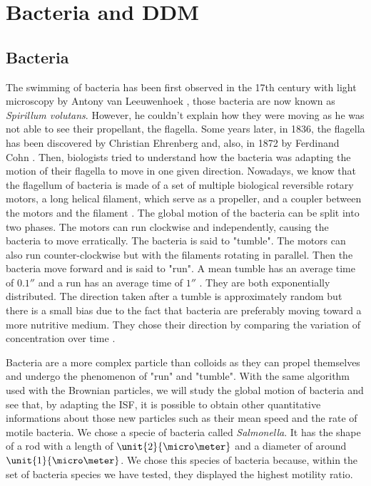 \documentclass[%
 aip,
 jmp,%
 amsmath,amssymb,
reprint,%
]{revtex4-1}
\begin{document}
\section{Bacteria and DDM}
\label{sec:BactSection}

\subsection{Bacteria}

The swimming of bacteria has been first observed in the 17th century with light microscopy by Antony van Leeuwenhoek \citep{23_dobell1933antony}, those bacteria are now known as \textit{Spirillum volutans}. However, he couldn't explain how they were moving as he was not able to see their propellant, the flagella. Some years later, in 1836, the flagella has been discovered by Christian Ehrenberg and, also, in 1872 by Ferdinand Cohn \citep{24_gillen2007genesis}. Then, biologists tried to understand how the bacteria was adapting the motion of their flagella to move in one given direction.
Nowadays, we know that the flagellum of bacteria is made of a set of multiple biological reversible rotary motors, a long helical filament, which serve as a propeller, and a coupler between the motors and the filament \citep{25_delalez2001bacterial}. The global motion of the bacteria can be split into two phases. The motors can run clockwise and independently, causing the bacteria to move erratically. The bacteria is said to "tumble". The motors can also run counter-clockwise but with the filaments rotating in parallel. Then the bacteria move forward and is said to "run". A mean tumble has an average time of $\unit{0.1}{\second}$ and a run has an average time of $\unit{1}{\second}$ \citep{5_berg2000motile}. They are both exponentially distributed. The direction taken after a tumble is approximately random but there is a small bias due to the fact that bacteria are preferably moving toward a more nutritive medium. They chose their direction by comparing the variation of concentration over time \citep{26_mitchell2006bacterial}.

Bacteria are a more complex particle than colloids as they can propel themselves and undergo the phenomenon of "run" and "tumble". With the same algorithm used with the Brownian particles, we will study the global motion of bacteria and see that, by adapting the ISF, it is possible to obtain other quantitative informations about those new particles \citep{4_Martinez20121637} such as their mean speed and the rate of motile bacteria. We chose a specie of bacteria called \textit{Salmonella}. It has the shape of a rod with a length of $\unit{2}{\micro\meter}$ and a diameter of around $\unit{1}{\micro\meter}$. We chose this species of bacteria because, within the set of bacteria species we have tested, they displayed the highest motility ratio.
\end{document}
